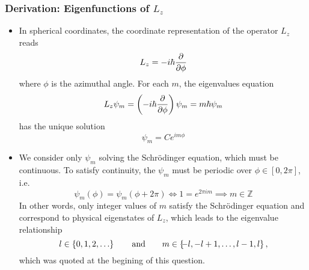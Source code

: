 \documentclass[11pt, a4paper]{article}
\newcommand{\Schro}{Schr\"{o}dinger\xspace}
\newcommand{\p}{\psi}  %
\begin{document}
\subsubsection{Derivation: Eigenfunctions of $ L_{z} $}
\begin{itemize}
	\item In spherical coordinates, the coordinate representation of the operator $ L_{z} $ reads
	\begin{equation*}
		L_{z} = - i \hbar \pdv{\phi}
	\end{equation*}
	where $ \phi $ is the azimuthal angle. For each $ m $, the eigenvalues equation
	\begin{equation*}
		L_{z} \p_{m} = \left(-i\hbar\pdv{\phi} \right)\p_{m} = m \hbar \p_{m}
	\end{equation*}
	has the unique solution
	\begin{equation*}
		\p_{m} = Ce^{im \phi}
	\end{equation*}
	
	\item We consider only $ \p_{m} $ solving the \Schro equation, which must be continuous. To satisfy continuity, the $ \p_{m} $ must be periodic over $ \phi \in [0, 2\pi] $, i.e.
	\begin{equation*}
		\p_{m}(\phi) = \p_{m}(\phi + 2\pi) \iff 1 = e^{2\pi i m}  \implies m \in \mathbb{Z}
	\end{equation*}
	In other words, only integer values of $ m $ satisfy the \Schro equation and correspond to physical eigenstates of $ L_{z} $, which leads to the eigenvalue relationship 
    \begin{equation*}
        l \in \left\{ 0, 1, 2, \ldots \right\} \qquad \text{and} \qquad m \in \left\{\hspace{-0.3em}-l, -l+1, \ldots, l-1, l\right\},
    \end{equation*}
    which was quoted at the begining of this question.
	
\end{itemize}
\end{document}
